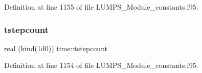 Definition at line 1155 of file L\+U\+M\+P\+S\+\_\+\+Module\+\_\+constants.\+f95.

\mbox{\label{namespacetime_a1e5711f85b68a21c078ff31788e419a8}} 
\subsubsection{\texorpdfstring{tstepcount}{tstepcount}}
{\footnotesize\ttfamily real (kind(1d0)) time\+::tstepcount}



Definition at line 1154 of file L\+U\+M\+P\+S\+\_\+\+Module\+\_\+constants.\+f95.

